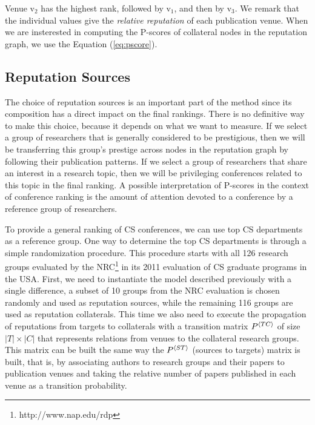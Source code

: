 \documentclass[notitlepage]{svjour3}
\begin{document}
Venue $\mbox{v}_2$ has the highest rank, followed by $\mbox{v}_1$, and then by $\mbox{v}_3$. We remark that the individual values give the {\em relative reputation} of each publication venue. 
%
When we are insterested in computing the P-scores of collateral nodes in the reputation graph, we use the Equation (\ref{eq:pscore}).


\subsection{Reputation Sources}
\label{sec:rep-sources}

The choice of reputation sources is an important part of the method since 
its composition has a direct impact on the final rankings. 
There is no definitive way to make this choice, because it depends on what we want 
to measure. If we select a group of researchers that is generally considered 
to be prestigious, then we will be transferring this group's prestige across nodes in the 
reputation graph by following their publication patterns. If we select a group of 
researchers that share an interest in a research topic, then we will be privileging
conferences related to this topic in the final ranking. A possible interpretation 
of P-scores in the context of conference ranking is the amount of attention devoted 
to a conference by a reference group of researchers.

To provide a general ranking of CS conferences, we can use top CS departments as 
a reference group.
One way to determine the top CS departments is through a simple randomization procedure.
This procedure starts with all 126 research groups evaluated by the NRC\footnote{http://www.nap.edu/rdp}
in its 2011 evaluation of CS graduate programs in the USA. 
First, we need to instantiate the model described previously with a single difference, 
a subset of 10 groups from the NRC evaluation is chosen randomly and used as reputation sources, while the remaining 116 groups
are used as reputation collaterals. This time we also need to execute the propagation of reputations 
from targets to collaterals with a transition matrix $P{^{\langle TC \rangle}}$ of size $|T|\times |C|$ that represents
relations from venues to the collateral research groups. This matrix can be built the same way
the $P{^{\langle ST \rangle}}$ (sources to targets) matrix is built, that is, by associating authors to research 
groups and their papers to publication venues and taking the relative number of papers published
in each venue as a transition probability.
\end{document}
